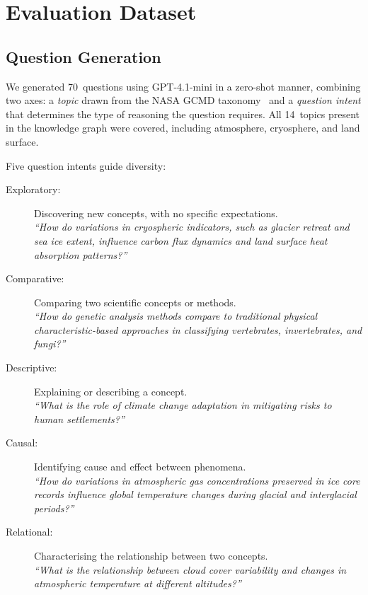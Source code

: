 \section{Evaluation Dataset}
\label{sec:dataset}

\subsection{Question Generation}
\label{subsec:question-generation}

We generated 70~questions using GPT-4.1-mini in a zero-shot manner, combining two axes: a \emph{topic} drawn from the NASA GCMD taxonomy~\citep{nasagcmd2023} and a \emph{question intent} that determines the type of reasoning the question requires. All 14~topics present in the knowledge graph were covered, including atmosphere, cryosphere, and land surface.

Five question intents guide diversity:

\begin{description}
\item[Exploratory:] Discovering new concepts, with no specific expectations. \\ \emph{``How do variations in cryospheric indicators, such as glacier retreat and sea ice extent, influence carbon flux dynamics and land surface heat absorption patterns?''}
\item[Comparative:] Comparing two scientific concepts or methods. \\ \emph{``How do genetic analysis methods compare to traditional physical characteristic-based approaches in classifying vertebrates, invertebrates, and fungi?''}
\item[Descriptive:] Explaining or describing a concept. \\ \emph{``What is the role of climate change adaptation in mitigating risks to human settlements?''}
\item[Causal:] Identifying cause and effect between phenomena. \\ \emph{``How do variations in atmospheric gas concentrations preserved in ice core records influence global temperature changes during glacial and interglacial periods?''}
\item[Relational:] Characterising the relationship between two concepts. \\ \emph{``What is the relationship between cloud cover variability and changes in atmospheric temperature at different altitudes?''}
\end{description}

